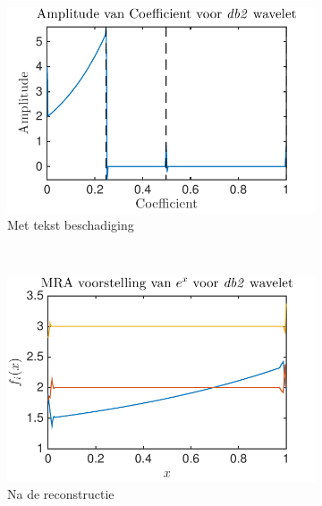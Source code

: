 \begin{figure}
    \centering
    \begin{subfigure}[b]{0.45\textwidth}
        \includegraphics[width=\textwidth]{../src/denoising/db2_noNoise/coef_exp_db2_2}
        \caption{Met tekst beschadiging}
        \label{fig:tiger}
    \end{subfigure}
    ~ %
    \begin{subfigure}[b]{0.45\textwidth}
        \includegraphics[width=\textwidth]{../src/denoising/db2_noNoise/MRA_exp_db2_2}
        \caption{Na de reconstructie}
        \label{fig:mouse}
    \end{subfigure}
    \begin{subfigure}[b]{0.45\textwidth}

\end{subfigure}
\end{figure}

